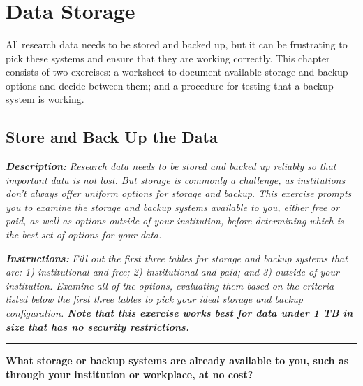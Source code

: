 \documentclass[
]{book}
\begin{document}
~

~

~

\hypertarget{data-storage}{%
\chapter{Data Storage}\label{data-storage}}

All research data needs to be stored and backed up, but it can be frustrating to pick these systems and ensure that they are working correctly. This chapter consists of two exercises: a worksheet to document available storage and backup options and decide between them; and a procedure for testing that a backup system is working.

\hypertarget{storage}{%
\section{Store and Back Up the Data}\label{storage}}

\textbf{\emph{Description:}} \emph{Research data needs to be stored and backed up reliably so that important data is not lost. But storage is commonly a challenge, as institutions don't always offer uniform options for storage and backup. This exercise prompts you to examine the storage and backup systems available to you, either free or paid, as well as options outside of your institution, before determining which is the best set of options for your data.}

\textbf{\emph{Instructions:}} \emph{Fill out the first three tables for storage and backup systems that are: 1) institutional and free; 2) institutional and paid; and 3) outside of your institution. Examine all of the options, evaluating them based on the criteria listed below the first three tables to pick your ideal storage and backup configuration. \textbf{Note that this exercise works best for data under 1 TB in size that has no security restrictions.}}

\begin{center}\rule{0.5\linewidth}{0.5pt}\end{center}

\textbf{What storage or backup systems are already available to you, such as through your institution or workplace, at no cost?}
\end{document}
